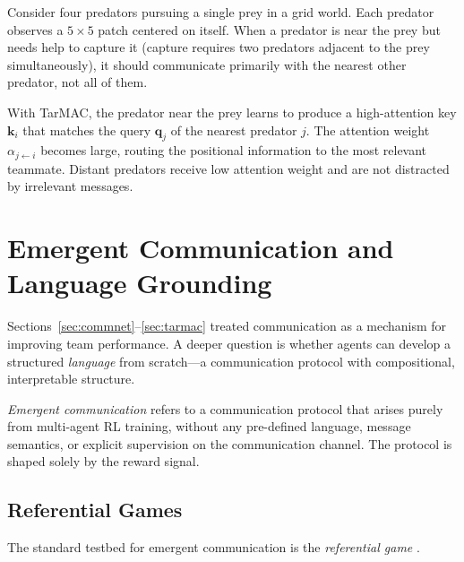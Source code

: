 \documentclass[11pt,a4paper]{article}
\begin{document}
\begin{example}
\label{ex:predator-prey}
Consider four predators pursuing a single prey in a grid world.
Each predator observes a $5 \times 5$ patch centered on itself.
When a predator is near the prey but needs help to capture it
(capture requires two predators adjacent to the prey
simultaneously), it should communicate primarily with the
nearest other predator, not all of them.

With TarMAC, the predator near the prey learns to produce a
high-attention key $\mathbf{k}_i$ that matches the query
$\mathbf{q}_j$ of the nearest predator $j$.  The attention
weight $\alpha_{j \leftarrow i}$ becomes large, routing the
positional information to the most relevant teammate.
Distant predators receive low attention weight and are not
distracted by irrelevant messages.
\end{example}

\section{Emergent Communication and Language Grounding}
\label{sec:emergent}

Sections~\ref{sec:commnet}--\ref{sec:tarmac} treated
communication as a mechanism for improving team performance.
A deeper question is whether agents can develop a structured
\emph{language} from scratch---a communication protocol with
compositional, interpretable structure.

\begin{definition}
\label{def:emergent-comm}
\emph{Emergent communication} refers to a communication protocol
that arises purely from multi-agent RL training, without any
pre-defined language, message semantics, or explicit supervision
on the communication channel.  The protocol is shaped solely by
the reward signal.
\end{definition}

\subsection{Referential Games}

The standard testbed for emergent communication is the
\emph{referential game} \citep{lazaridou2017}.
\end{document}
